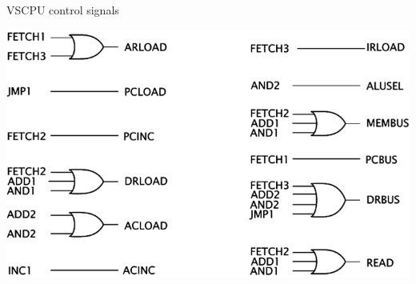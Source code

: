 \begin{frame}{VSCPU control signals}
  \begin{center}
    \includegraphics[scale=0.4]{ControlSignals}
  \end{center}
\end{frame}


